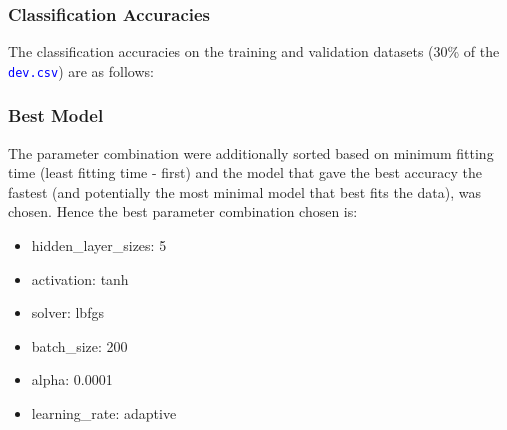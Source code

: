 \documentclass[11pt,a4paper]{article}
\def\colortt#1{\textcolor{blue}{\texttt{#1}}}
\begin{document}
\subsubsection{Classification Accuracies}
The classification accuracies on the training and validation datasets (30\% of the \colortt{dev.csv}) are as follows:


\subsubsection{Best Model}
The parameter combination were additionally sorted based on minimum fitting time (least fitting time - first) and the model that gave the best accuracy the fastest (and potentially the most minimal model that best fits the data), was chosen. Hence the best parameter combination chosen is:
\begin{itemize}
    \itemsep0em
    \item hidden\_layer\_sizes: 5
    \item activation: tanh
    \item solver: lbfgs
    \item batch\_size: 200
    \item alpha: 0.0001
    \item learning\_rate: adaptive
\end{itemize}
\end{document}
